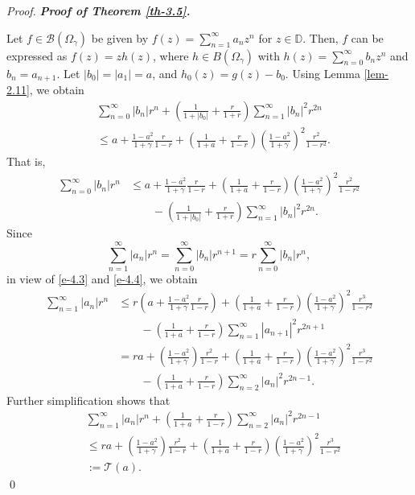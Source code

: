 \documentclass[a4paper,12pt]{amsart}
\theoremstyle{plain}
\theoremstyle{definition}
\newenvironment{pf}[1][]{%
 \vskip 3mm
 \noindent
 \ifthenelse{\equal{#1}{}}%
  {{\slshape Proof. }}%
  {{\slshape #1.} }%
 }%
{\qed\bigskip}
\begin{document}
\begin{pf}[\bf Proof of Theorem \ref{th-3.5}]
	Let $ f\in\mathcal{B}(\Omega_{\gamma}) $ be given by $ f(z)=\sum_{n=1}^{\infty}a_nz^n $ for $ z\in\mathbb{D} $. Then, $ f $ can be expressed as $ f(z)=zh(z) $, where $ h\in B(\Omega_{\gamma}) $ with $ h(z)=\sum_{n=0}^{\infty}b_nz^n $ and $ b_n=a_{n+1}. $ Let  $ |b_0|=|a_1|=a $, and $ h_0(z)=g(z)-b_0 $. Using Lemma \ref{lem-2.11}, we obtain
\begin{align} \label{e-4.2}&
\sum_{n=0}^{\infty}|b_n|r^n+\left(\frac{1}{1+|b_0|}+\frac{r}{1+r}\right)\sum_{n=1}^{\infty}|b_n|^2r^{2n}\\&\leq a+\frac{1-a^2}{1+\gamma}\frac{r}{1-r}+\left(\frac{1}{1+a}+\frac{r}{1-r}\right)\left(\frac{1-a^2}{1+\gamma}\right)^2\frac{r^2}{1-r^2}\nonumber.
\end{align}
That is,
 \begin{align}\label{e-4.3}
	\sum_{n=0}^{\infty}|b_n|r^n&\leq a+\frac{1-a^2}{1+\gamma}\frac{r}{1-r}+\left(\frac{1}{1+a}+\frac{r}{1-r}\right)\left(\frac{1-a^2}{1+\gamma}\right)^2\frac{r^2}{1-r^2}\\&\quad\quad-\left(\frac{1}{1+|b_0|}+\frac{r}{1+r}\right)\sum_{n=1}^{\infty}|b_n|^2r^{2n}\nonumber.
\end{align}	
	Since 
	\begin{equation}\label{e-4.4}
		\sum_{n=1}^{\infty}|a_n|r^n=\sum_{n=0}^{\infty}|b_n|r^{n+1}=r\sum_{n=0}^{\infty}|b_n|r^n,
	\end{equation}
in view of \eqref{e-4.3} and \eqref{e-4.4}, we obtain 
\begin{align*}
	\sum_{n=1}^{\infty}|a_n|r^n&\leq r\left(a+\frac{1-a^2}{1+\gamma}\frac{r}{1-r}\right)+\left(\frac{1}{1+a}+\frac{r}{1-r}\right)\left(\frac{1-a^2}{1+\gamma}\right)^2\frac{r^3}{1-r^2}\\&\quad\quad-\left(\frac{1}{1+a}+\frac{r}{1-r}\right)\sum_{n=1}^{\infty}|a_{n+1}|^2r^{2n+1}\\&=ra+\left(\frac{1-a^2}{1+\gamma}\right)\frac{r^2}{1-r}+\left(\frac{1}{1+a}+\frac{r}{1-r}\right)\left(\frac{1-a^2}{1+\gamma}\right)^2\frac{r^3}{1-r^2}\\&\quad\quad-\left(\frac{1}{1+a}+\frac{r}{1-r}\right)\sum_{n=2}^{\infty}|a_{n}|^2r^{2n-1}.
\end{align*}
Further simplification shows that
\begin{align*} &
	\sum_{n=1}^{\infty}|a_n|r^n+\left(\frac{1}{1+a}+\frac{r}{1-r}\right)\sum_{n=2}^{\infty}|a_n|^2r^{2n-1}\\&\leq ra +\left(\frac{1-a^2}{1+\gamma}\right)\frac{r^2}{1-r}+\left(\frac{1}{1+a}+\frac{r}{1-r}\right)\left(\frac{1-a^2}{1+\gamma}\right)^2\frac{r^3}{1-r^2}\\&:= \mathcal{T}(a).

\end{align*}
\end{pf}
\end{document}
